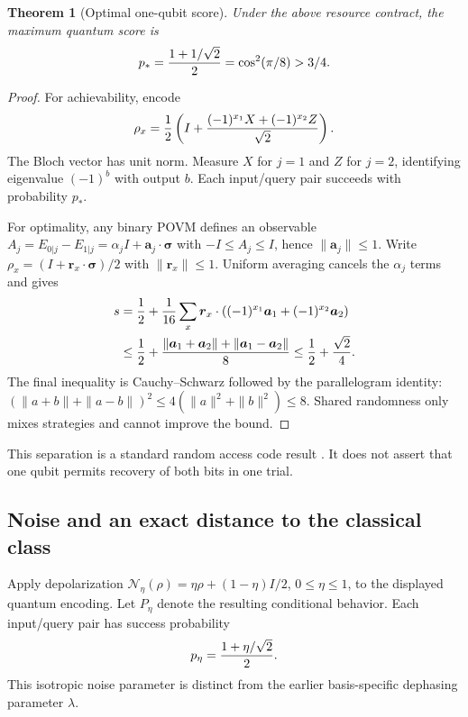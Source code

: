 \documentclass[11pt,a4paper]{article}
\newtheorem{theorem}{Theorem}[section]
\theoremstyle{definition}
\begin{document}
\begin{theorem}[Optimal one-qubit score]\label{thm:quantum}
Under the above resource contract, the maximum quantum score is
\[
 p_*={1+1/\sqrt2\over2}=\cos^2(\pi/8)>3/4.
\]
\end{theorem}
\begin{proof}
For achievability, encode
\[
 \rho_x={1\over2}\left(I+{(-1)^{x_1}X+(-1)^{x_2}Z\over\sqrt2}\right).
\]
The Bloch vector has unit norm. Measure $X$ for $j=1$ and $Z$ for $j=2$, identifying eigenvalue $(-1)^b$ with output $b$. Each input/query pair succeeds with probability $p_*$.

For optimality, any binary POVM defines an observable $A_j=E_{0|j}-E_{1|j}=\alpha_j I+\boldsymbol a_j\cdot\boldsymbol\sigma$ with $-I\le A_j\le I$, hence $\|\boldsymbol a_j\|\le1$. Write $\rho_x=(I+\boldsymbol r_x\cdot\boldsymbol\sigma)/2$ with $\|\boldsymbol r_x\|\le1$. Uniform averaging cancels the $\alpha_j$ terms and gives
\begin{align*}
 s&={1\over2}+{1\over16}\sum_x
 \boldsymbol r_x\cdot\left((-1)^{x_1}\boldsymbol a_1+(-1)^{x_2}\boldsymbol a_2\right)\\
 &\le {1\over2}+{\|\boldsymbol a_1+\boldsymbol a_2\|+
 \|\boldsymbol a_1-\boldsymbol a_2\|\over8}
 \le {1\over2}+{\sqrt2\over4}.
\end{align*}
The final inequality is Cauchy--Schwarz followed by the parallelogram identity:
$(\|a+b\|+\|a-b\|)^2\le4(\|a\|^2+\|b\|^2)\le8$.
Shared randomness only mixes strategies and cannot improve the bound.
\end{proof}
This separation is a standard random access code result \cite{qrac}. It does not assert that one qubit permits recovery of both bits in one trial.

\subsection{Noise and an exact distance to the classical class}
Apply depolarization $\mathcal N_\eta(\rho)=\eta\rho+(1-\eta)I/2$, $0\le\eta\le1$, to the displayed quantum encoding. Let $P_\eta$ denote the resulting conditional behavior. Each input/query pair has success probability
\[
 p_\eta={1+\eta/\sqrt2\over2}.
\]
This isotropic noise parameter is distinct from the earlier basis-specific dephasing parameter $\lambda$.
\end{document}

